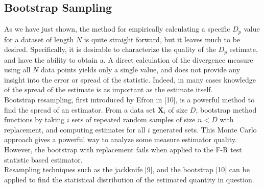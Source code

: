 \documentclass{article}
\begin{document}
	\subsection{\small Bootstrap Sampling}
	\indent	As we have just shown, the method for empirically calculating a specific $D_p$ value for a dataset of length $N$ is quite straight forward, but it leaves much to be desired. Specifically, it is desirable to characterize the quality of the $D_p$ estimate, and have the ability to obtain a. A direct calculation of the divergence measure using all $N$ data points yields only a single value, and does not provide any insight into the error or spread of  the statistic. Indeed, in many cases knowledge of the spread of the estimate is as important as the estimate itself.
	\\[0.5ex]
	\indent Bootstrap resampling, first introduced by Efron in [10], is a powerful method to find the spread of an estimator. From a data set $\textbf{X}_i$ of size $D$, bootstrap method functions by taking $i$ sets of repeated random samples of size $n<D$ with replacement, and computing estimates for all $i$ generated sets. This Monte Carlo approach gives a powerful way to analyze some measure estimator quality. However, the bootstrap with replacement fails when applied to the F-R test statistic based estimator.
	\\ [0.5ex]
	 Resampling techniques such as the jackknife [9], and the bootstrap [10] can be applied to find the statistical distribution of the estimated quantity in question. 
	\\ [0.5ex]

	
	
\end{document}
